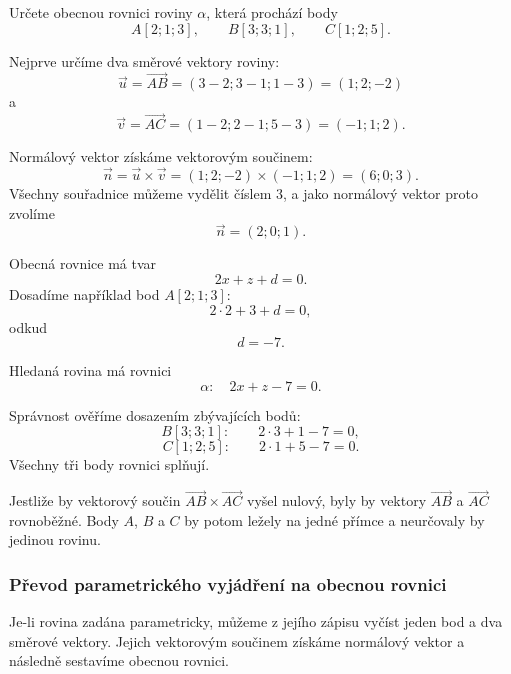 \begin{example}
    \label{exa:General_plane_three_points}
    Určete obecnou rovnici roviny $\alpha$, která prochází body
    \[
        A[2;1;3],
        \qquad
        B[3;3;1],
        \qquad
        C[1;2;5].
    \]

    Nejprve určíme dva směrové vektory roviny:
    \[
        \vec{u}
        =\overrightarrow{AB}
        =(3-2;3-1;1-3)
        =(1;2;-2)
    \]
    a
    \[
        \vec{v}
        =\overrightarrow{AC}
        =(1-2;2-1;5-3)
        =(-1;1;2).
    \]

    Normálový vektor získáme vektorovým součinem:
    \[
        \vec{n}
        =\vec{u}\times\vec{v}
        =(1;2;-2)\times(-1;1;2)
        =(6;0;3).
    \]
    Všechny souřadnice můžeme vydělit číslem $3$, a jako normálový vektor
    proto zvolíme
    \[
        \vec{n}=(2;0;1).
    \]

    Obecná rovnice má tvar
    \[
        2x+z+d=0.
    \]
    Dosadíme například bod $A[2;1;3]$:
    \[
        2\cdot2+3+d=0,
    \]
    odkud
    \[
        d=-7.
    \]

    Hledaná rovina má rovnici
    \[
        \alpha:\quad 2x+z-7=0.
    \]

    Správnost ověříme dosazením zbývajících bodů:
    \[
        B[3;3;1]:
        \qquad
        2\cdot3+1-7=0,
    \]
    \[
        C[1;2;5]:
        \qquad
        2\cdot1+5-7=0.
    \]
    Všechny tři body rovnici splňují.
\end{example}

\begin{remark}
    Jestliže by vektorový součin
    $\overrightarrow{AB}\times\overrightarrow{AC}$ vyšel nulový, byly by
    vektory $\overrightarrow{AB}$ a $\overrightarrow{AC}$ rovnoběžné.
    Body $A$, $B$ a $C$ by potom ležely na jedné přímce a neurčovaly by
    jedinou rovinu.
\end{remark}

\subsubsection{Převod parametrického vyjádření na obecnou rovnici}
\label{subsubsec:Parametric_to_general_plane}

Je-li rovina zadána parametricky, můžeme z jejího zápisu vyčíst jeden bod
a dva směrové vektory. Jejich vektorovým součinem získáme normálový vektor
a následně sestavíme obecnou rovnici.

